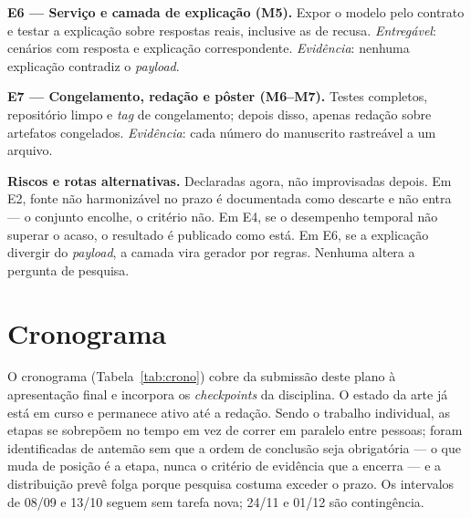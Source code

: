 \documentclass[conference]{IEEEtran}
\begin{document}
\textbf{E6 --- Serviço e camada de explicação (M5).} Expor o modelo pelo contrato
e testar a explicação sobre respostas reais, inclusive as de recusa.
\emph{Entregável}: cenários com resposta e explicação correspondente.
\emph{Evidência}: nenhuma explicação contradiz o \emph{payload}.

\textbf{E7 --- Congelamento, redação e pôster (M6--M7).} Testes completos,
repositório limpo e \emph{tag} de congelamento; depois disso, apenas redação
sobre artefatos congelados. \emph{Evidência}: cada número do manuscrito
rastreável a um arquivo.

\textbf{Riscos e rotas alternativas.} Declaradas agora, não improvisadas depois.
Em E2, fonte não harmonizável no prazo é documentada como descarte e não entra ---
o conjunto encolhe, o critério não. Em E4, se o desempenho temporal não superar o
acaso, o resultado é publicado como está. Em E6, se a explicação divergir do
\emph{payload}, a camada vira gerador por regras. Nenhuma altera a pergunta de
pesquisa.

\section{Cronograma}
\label{sec:crono}

O cronograma (Tabela~\ref{tab:crono}) cobre da submissão deste plano à
apresentação final e incorpora os \emph{checkpoints} da disciplina. O estado da
arte já está em curso e permanece ativo até a redação. Sendo o trabalho
individual, as etapas se sobrepõem no tempo em vez de correr em paralelo entre
pessoas; foram identificadas de antemão sem que a ordem de conclusão seja
obrigatória --- o que muda de posição é a etapa, nunca o critério de evidência
que a encerra --- e a distribuição prevê folga porque pesquisa costuma exceder o
prazo. Os intervalos de 08/09 e 13/10 seguem sem tarefa nova; 24/11 e 01/12 são
contingência.
\end{document}
